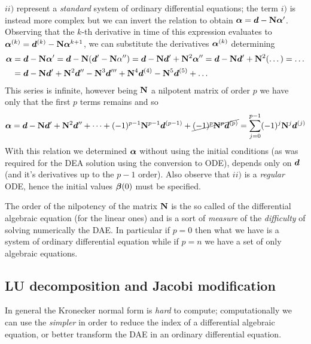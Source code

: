 		$ii)$ represent a \textit{standard} system of ordinary differential equations; the term $i)$ is instead more complex but we can invert the relation to obtain $\boldsymbol{\alpha} = \boldsymbol{d} - \mathbf{N} \boldsymbol{\alpha}'$. Observing that the $k$-th derivative in time of this expression evaluates to $\boldsymbol{\alpha}^{(k)} = \boldsymbol{d}^{(k)} - \mathbf{N} \boldsymbol{\alpha}^{k+1}$, we can substitute the derivatives $\boldsymbol{\alpha}^{(k)}$ determining
		\begin{align*}
			\boldsymbol{\alpha} & = \boldsymbol{d} - \mathbf{N} \boldsymbol{\alpha}' = \boldsymbol{d} - \mathbf{N}(\boldsymbol{d}' - \mathbf{N} \alpha'') = \boldsymbol{d} - \mathbf{N} \boldsymbol{d}' + \mathbf{N}^2 \boldsymbol{\alpha}'' = \boldsymbol{d} - \mathbf{N} \boldsymbol{d}' + \mathbf{N}^2 (\dots) = \dots \\
			& = \boldsymbol{d} - \mathbf{N} \boldsymbol{d}' + \mathbf{N}^2 \boldsymbol{d}'' - \mathbf{N}^3 \boldsymbol{d}''' + \mathbf{N}^4 \boldsymbol{d}^{(4)} - \mathbf{N}^5 \boldsymbol{d}^{(5)} + \dots
		\end{align*}
		This series is infinite, however being $\mathbf{N}$ a nilpotent matrix of order $p$ we have only that the first $p$ terms remains and so
		\begin{equation}
			\boldsymbol{\alpha} = \boldsymbol{d} - \mathbf{N} \boldsymbol{d}' + \mathbf{N}^2 \boldsymbol{d}'' +\dots  + (-1)^{p-1} \mathbf{N}^{p-1}\boldsymbol{d}^{(p-1)} + \cancel{(-1)^p \mathbf{N}^p \boldsymbol{d}^{(p)}} = \sum_{j=0}^{p-1} (-1)^j \mathbf{N}^j \boldsymbol{d}^{(j)}
		\end{equation}
		With this relation we determined $\boldsymbol{\alpha}$ without using the initial conditions (as was required for the DEA solution using the conversion to ODE), depends only on $\boldsymbol{d}$ (and it's derivatives up to the $p-1$ order). Also observe that $ii)$ is a \textit{regular} ODE, hence the initial values $\boldsymbol{\beta}(0)$ must be specified.
		
		The order of the nilpotency of the matrix $\mathbf{N}$ is the so called  of the differential algebraic equation (for the linear ones) and is a sort of \textit{measure} of the \textit{difficulty} of solving numerically the DAE. In particular if $p=0$ then what we have is a system of ordinary differential equation while if $p=n$ we have a set of only algebraic equations.
	
	\subsection{LU decomposition and Jacobi modification}
		In general the Kronecker normal form is \textit{hard} to compute; computationally we can use the \textit{simpler}  in order to reduce the index of a differential algebraic equation, or better transform the DAE in an ordinary differential equation. 
		
